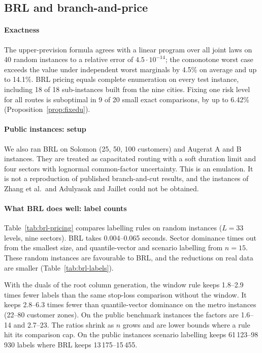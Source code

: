 \documentclass[preprint,11pt]{elsarticle}
\theoremstyle{definition}
\theoremstyle{remark}
\begin{document}
\subsection{BRL and branch-and-price}\label{sec:res-brl}

\paragraph{Exactness} The upper-prevision formula agrees with a linear program over all joint laws on 40 random instances to a relative error of $4.5\cdot10^{-14}$; the comonotone worst case exceeds the value under independent worst marginals by 4.5\% on average and up to 14.1\%. BRL pricing equals complete enumeration on every test instance, including 18 of 18 sub-instances built from the nine cities. Fixing one risk level for all routes is suboptimal in 9 of 20 small exact comparisons, by up to 6.42\% (Proposition~\ref{prop:fixedu}).

\paragraph{Public instances: setup} We also ran BRL on Solomon (25, 50, 100 customers) and Augerat A and B instances. They are treated as capacitated routing with a soft duration limit and four sectors with lognormal common-factor uncertainty. This is an emulation. It is not a reproduction of published branch-and-cut results, and the instances of Zhang et al.\ and Adulyasak and Jaillet could not be obtained.

\paragraph{What BRL does well: label counts} Table~\ref{tab:brl-pricing} compares labelling rules on random instances ($L=33$ levels, nine sectors). BRL takes 0.004--0.065 seconds. Sector dominance times out from the smallest size, and quantile-vector and scenario labelling from $n=15$. These random instances are favourable to BRL, and the reductions on real data are smaller (Table~\ref{tab:brl-labels}).

With the duals of the root column generation, the window rule keeps 1.8--2.9 times fewer labels than the same stop-loss comparison without the window. It keeps 2.8--6.3 times fewer than quantile-vector dominance on the metro instances (22--80 customer zones). On the public benchmark instances the factors are 1.6--14 and 2.7--23. The ratios shrink as $n$ grows and are lower bounds where a rule hit its comparison cap. On the public instances scenario labelling keeps 61\,123--98\,930 labels where BRL keeps 13\,175--15\,455.
\end{document}
